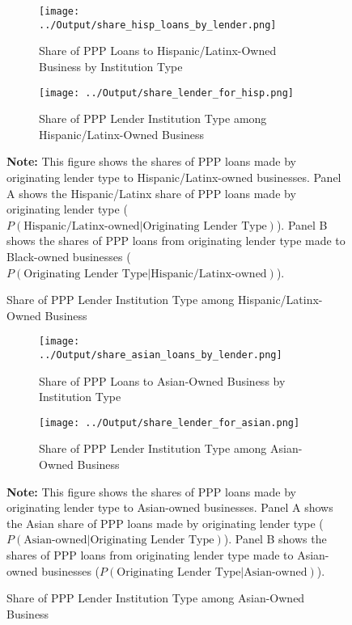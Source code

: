 \documentclass[11pt]{article}
\begin{document}
\newpage
\begin{figure}[H]
	\caption{\textbf{Hispanic/Latinx-Owned Business PPP Lending by Institution Type}} \label{f:hisp50}
	\centering
	\begin{subfigure}{\linewidth}
		\caption{Share of PPP Loans to Hispanic/Latinx-Owned Business by Institution Type}
		\centering
		\texttt{[image: ../Output/share\_hisp\_loans\_by\_lender.png]}
		\vspace{0.5cm}
	\end{subfigure}

	\begin{subfigure}{\linewidth}
		\caption{Share of PPP Lender Institution Type among Hispanic/Latinx-Owned Business}
		\centering
		\texttt{[image: ../Output/share\_lender\_for\_hisp.png]}
	\end{subfigure}

	\begin{minipage}{\textwidth} \medskip
		\footnotesize{{\bf Note: }This figure shows the shares of PPP loans made by originating lender type to Hispanic/Latinx-owned businesses. Panel A shows the Hispanic/Latinx share of PPP loans made by originating lender type ($P(\text{Hispanic/Latinx-owned} | \text{Originating Lender Type})$). Panel B shows the shares of PPP loans from originating lender type made to Black-owned businesses ($P(\text{Originating Lender Type} | \text{Hispanic/Latinx-owned})$).}
	\end{minipage}
\end{figure}

\newpage
\begin{figure}[H]
	\caption{\textbf{Asian-Owned Business PPP Lending by Institution Type}} \label{f:asian50}
	\centering
	\begin{subfigure}{\linewidth}
		\caption{Share of PPP Loans to Asian-Owned Business by Institution Type}
		\centering
		\texttt{[image: ../Output/share\_asian\_loans\_by\_lender.png]}
		\vspace{0.5cm}
	\end{subfigure}

	\begin{subfigure}{\linewidth}
		\caption{Share of PPP Lender Institution Type among Asian-Owned Business}
		\centering
		\texttt{[image: ../Output/share\_lender\_for\_asian.png]}
	\end{subfigure}

	\begin{minipage}{\textwidth} \medskip
		\footnotesize{{\bf Note: }This figure shows the shares of PPP loans made by originating lender type to Asian-owned businesses. Panel A shows the Asian share of PPP loans made by originating lender type ($P(\text{Asian-owned} | \text{Originating Lender Type})$). Panel B shows the shares of PPP loans from originating lender type made to Asian-owned businesses ($P(\text{Originating Lender Type} | \text{Asian-owned})$).}
	\end{minipage}
\end{figure}
\end{document}
